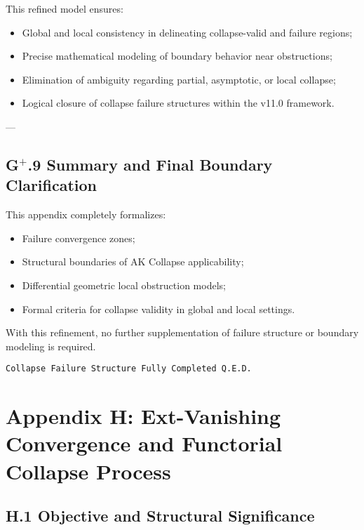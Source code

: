 \documentclass[11pt]{article}
\begin{document}
This refined model ensures:

\begin{itemize}
    \item Global and local consistency in delineating collapse-valid and failure regions;
    \item Precise mathematical modeling of boundary behavior near obstructions;
    \item Elimination of ambiguity regarding partial, asymptotic, or local collapse;
    \item Logical closure of collapse failure structures within the v11.0 framework.
\end{itemize}

---

\subsection*{G$^{+}$.9 Summary and Final Boundary Clarification}

This appendix completely formalizes:

\begin{itemize}
    \item Failure convergence zones;
    \item Structural boundaries of AK Collapse applicability;
    \item Differential geometric local obstruction models;
    \item Formal criteria for collapse validity in global and local settings.
\end{itemize}

With this refinement, no further supplementation of failure structure or boundary modeling is required.

\begin{flushright}
\texttt{Collapse Failure Structure \quad Fully Completed \quad Q.E.D.}
\end{flushright}



\section*{Appendix H: Ext-Vanishing Convergence and Functorial Collapse Process}

\subsection*{H.1 Objective and Structural Significance}
\end{document}
